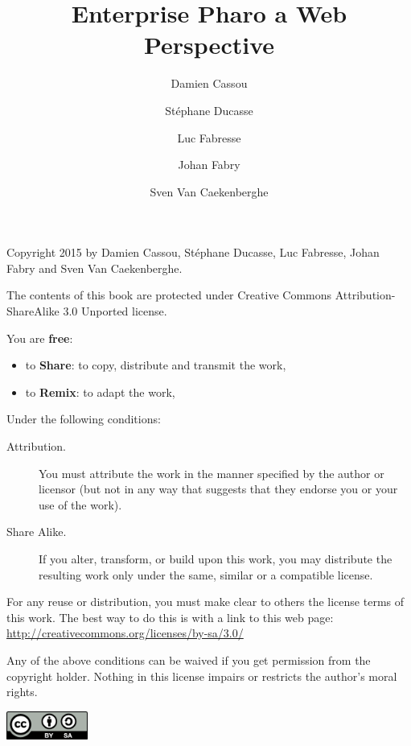 \documentclass[10pt,twoside,english,showtrims]{support/latex/sbabook}
\title{Enterprise Pharo\titlebreak{:} a Web Perspective}
\author{
    Damien Cassou \and
    Stéphane Ducasse \and
    Luc Fabresse \and
    Johan Fabry \and
    Sven Van Caekenberghe}
\date{\gitdate\titlebreak[\smallskip]{ -- }\protect\gitCommitInfo}
\begin{document}
\begin{titlingpage}
  \let\cleardoublepage\clearpage %
  \maketitle
\end{titlingpage}

\pagestyle{empty}
{\small

  Copyright 2015 by Damien Cassou, Stéphane Ducasse, Luc Fabresse, Johan Fabry
  and Sven Van Caekenberghe.

  The contents of this book are protected under Creative Commons
  Attribution-ShareAlike 3.0 Unported license.

  You are \textbf{free}:
  \begin{itemize}
  \item to \textbf{Share}: to copy, distribute and transmit the work,
  \item to \textbf{Remix}: to adapt the work,
  \end{itemize}

  Under the following conditions:
  \begin{description}
  \item[Attribution.] You must attribute the work in the manner specified by the
    author or licensor (but not in any way that suggests that they endorse you
    or your use of the work).
  \item[Share Alike.] If you alter, transform, or build upon this work, you may
    distribute the resulting work only under the same, similar or a compatible
    license.
  \end{description}

  For any reuse or distribution, you must make clear to others the
  license terms of this work. The best way to do this is with a link to
  this web page: \\
  \url{http://creativecommons.org/licenses/by-sa/3.0/}

  Any of the above conditions can be waived if you get permission from
  the copyright holder. Nothing in this license impairs or restricts the
  author's moral rights.

  \begin{Center}
    \includegraphics[width=0.2\textwidth]{support/latex/CreativeCommons-BY-SA.pdf}
  \end{Center}

}
\end{document}
